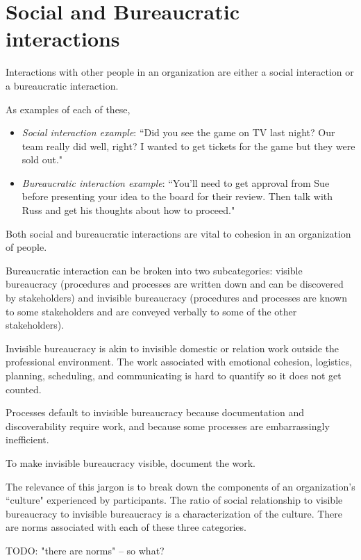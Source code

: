 
\section{Social and Bureaucratic interactions\label{sec:socializing}}

Interactions with other people in an organization are either a social interaction or a bureaucratic interaction. 

As examples of each of these,
\begin{itemize}
\item \textit{Social interaction example}: ``Did you see the game on TV last night? Our team really did well, right? I wanted to get tickets for the game but they were sold out."
\item \textit{Bureaucratic interaction example}: ``You'll need to get approval from Sue before presenting your idea to the board for their review. Then talk with Russ and get his thoughts about how to proceed."
\end{itemize}
Both social and bureaucratic interactions are vital to cohesion in an organization of people. 


Bureaucratic interaction can be broken into two subcategories: 
\gls{visible bureaucracy} 
(procedures and processes are written down and can be discovered by stakeholders) and 
\gls{invisible bureaucracy} 
(procedures and processes are known to some stakeholders and are conveyed verbally to some of the other stakeholders).

Invisible bureaucracy is akin to invisible domestic or relation work outside the professional environment. The work associated with emotional cohesion, logistics, planning, scheduling, and communicating is hard to quantify so it does not get counted.

Processes default to invisible bureaucracy because documentation and discoverability require work, and because some processes are embarrassingly inefficient. 

To make invisible bureaucracy visible, document the work.


The relevance of this jargon is to break down the components of an organization's ``culture" experienced by participants. The ratio of social relationship to visible bureaucracy to invisible bureaucracy is a characterization of the culture. There are norms associated with each of these three categories.

TODO: "there are norms" -- so what?